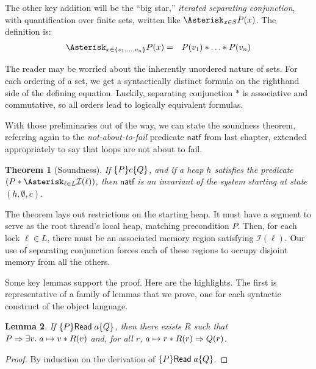 \documentclass{amsbook}
\newtheorem{theorem}{Theorem}[chapter]
\newtheorem{lemma}[theorem]{Lemma}
\theoremstyle{definition}
\theoremstyle{remark}
\numberwithin{section}{chapter}
\numberwithin{equation}{chapter}
\begin{document}
\renewcommand{\bigstar}[3]{\Asterisk_{#1 \in #2} #3}
\newcommand{\bigstarp}[3]{\Asterisk_{#1 \in #2} {\left ( #3 \right )}}

The other key addition will be the ``big star,'' \emph{iterated separating conjunction}, with quantification over finite sets, written like $\bigstar{x}{S}{P(x)}$.
The definition is:
\begin{eqnarray*}
  \bigstar{x}{\{v_1, \ldots, v_n\}}{P(x)} &=& P(v_1) * \ldots * P(v_n)
\end{eqnarray*}

The reader may be worried about the inherently unordered nature of sets.
For each ordering of a set, we get a syntactically distinct formula on the righthand side of the defining equation.
Luckily, separating conjunction $*$ is associative and commutative, so all orders lead to logically equivalent formulas.

With those preliminaries out of the way, we can state the soundness theorem, referring again to the \emph{not-about-to-fail} predicate $\mathsf{natf}$ from last chapter, extended appropriately to say that loops are not about to fail.

\invariants
\begin{theorem}[Soundness]
  If $\{P\} c \{Q\}$, and if a heap $h$ satisfies the predicate $(P * \bigstar{\ell}{L}{\mathcal I(\ell)})$, then $\mathsf{natf}$ is an invariant of the system starting at state $(h, \emptyset, c)$.
\end{theorem}

The theorem lays out restrictions on the starting heap.
It must have a segment to serve as the root thread's local heap, matching precondition $P$.
Then, for each lock $\ell \in L$, there must be an associated memory region satisfying $\mathcal I(\ell)$.
Our use of separating conjunction forces each of these regions to occupy disjoint memory from all the others.

Some key lemmas support the proof.
Here are the highlights.
The first is representative of a family of lemmas that we prove, one for each syntactic construct of the object language.

\begin{lemma}
  If $\{P\} \mathsf{Read} \; a \{Q\}$, then there exists $R$ such that $P \Rightarrow \exists v. \; a \mapsto v * R(v)$ and, for all $r$, $a \mapsto r * R(r) \Rightarrow Q(r)$.
\end{lemma}
\begin{proof}
  By induction on the derivation of $\{P\} \mathsf{Read} \; a \{Q\}$.
\end{proof}
\end{document}
